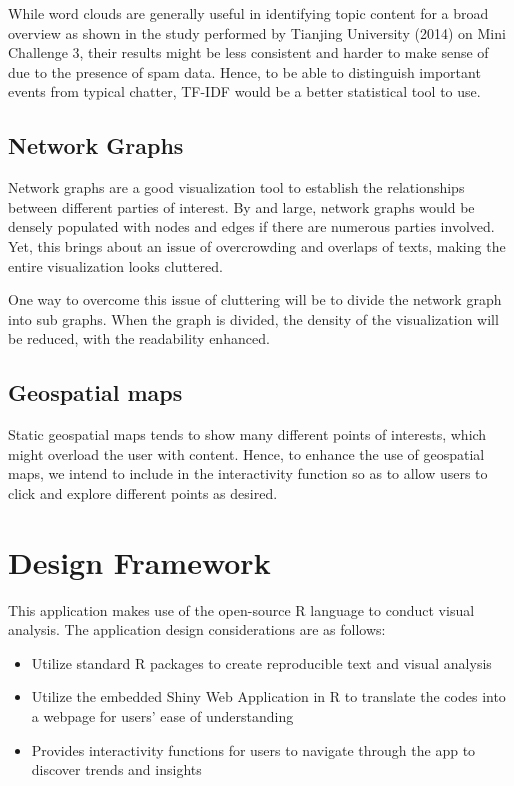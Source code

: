 \documentclass{acm_proc_article-sp}
\begin{document}
While word clouds are generally useful in identifying topic content for
a broad overview as shown in the study performed by Tianjing University
(2014) on Mini Challenge 3, their results might be less consistent and
harder to make sense of due to the presence of spam data. Hence, to be
able to distinguish important events from typical chatter, TF-IDF would
be a better statistical tool to use.

\hypertarget{network-graphs}{%
\subsection{Network Graphs}\label{network-graphs}}

Network graphs are a good visualization tool to establish the
relationships between different parties of interest. By and large,
network graphs would be densely populated with nodes and edges if there
are numerous parties involved. Yet, this brings about an issue of
overcrowding and overlaps of texts, making the entire visualization
looks cluttered.

One way to overcome this issue of cluttering will be to divide the
network graph into sub graphs. When the graph is divided, the density of
the visualization will be reduced, with the readability enhanced.

\hypertarget{geospatial-maps}{%
\subsection{Geospatial maps}\label{geospatial-maps}}

Static geospatial maps tends to show many different points of interests,
which might overload the user with content. Hence, to enhance the use of
geospatial maps, we intend to include in the interactivity function so
as to allow users to click and explore different points as desired.

\hypertarget{design-framework}{%
\section{Design Framework}\label{design-framework}}

This application makes use of the open-source R language to conduct
visual analysis. The application design considerations are as follows:

\begin{itemize}
\item
  Utilize standard R packages to create reproducible text and visual
  analysis
\item
  Utilize the embedded Shiny Web Application in R to translate the codes
  into a webpage for users' ease of understanding
\item
  Provides interactivity functions for users to navigate through the app
  to discover trends and insights
\end{itemize}
\end{document}
